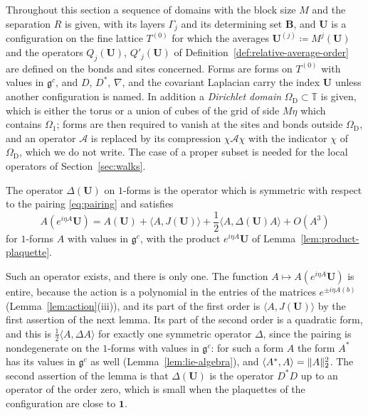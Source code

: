 \documentclass[11pt]{preprint}
\newcommand{\id}{\mathbf 1}
\DeclarePairedDelimiter{\norm}{\lVert}{\rVert}
\numberwithin{equation}{section}
\begin{document}
Throughout this section a sequence of domains with the block size $M$ and the separation $R$ is given, with its layers $\Gamma_j$ and its determining set $\mathbf B$, and $\mathbf U$ is a configuration on the fine lattice $T^{(0)}$ for which the averages $\mathbf U^{(j)} \coloneqq M^j(\mathbf U)$ and the operators $Q_j(\mathbf U)$, $Q'_j(\mathbf U)$ of Definition~\ref{def:relative-average-order} are defined on the bonds and sites concerned. Forms are forms on $T^{(0)}$ with values in $\mathfrak g^c$, and $D$, $D^*$, $\nabla$, and the covariant Laplacian carry the index $\mathbf U$ unless another configuration is named. In addition a \emph{Dirichlet domain} $\Omega_\mathrm D \subset \mathbb T$ is given, which is either the torus or a union of cubes of the grid of side $M\eta$ which contains $\Omega_1$; forms are then required to vanish at the sites and bonds outside $\Omega_\mathrm D$, and an operator $\mathcal A$ is replaced by its compression $\chi\mathcal A\chi$ with the indicator $\chi$ of $\Omega_\mathrm D$, which we do not write. The case of a proper subset is needed for the local operators of Section~\ref{sec:walks}.

\begin{definition}\label{def:hessian}
The operator $\Delta(\mathbf U)$ on $1$-forms is the operator which is symmetric with respect to the pairing \eqref{eq:pairing} and satisfies
\begin{equation}\label{eq:action-expansion}
    A(e^{i\eta A}\mathbf U) = A(\mathbf U) + \langle A, J(\mathbf U)\rangle + \frac{1}{2}\langle A, \Delta(\mathbf U)A\rangle + O(A^3)
\end{equation}
for $1$-forms $A$ with values in $\mathfrak g^c$, with the product $e^{i\eta A}\mathbf U$ of Lemma~\ref{lem:product-plaquette}.
\end{definition}

Such an operator exists, and there is only one. The function $A \mapsto A(e^{i\eta A}\mathbf U)$ is entire, because the action is a polynomial in the entries of the matrices $e^{\pm i\eta A(b)}$ (Lemma~\ref{lem:action}(iii)), and its part of the first order is $\langle A, J(\mathbf U)\rangle$ by the first assertion of the next lemma. Its part of the second order is a quadratic form, and this is $\frac{1}{2}\langle A, \Delta A\rangle$ for exactly one symmetric operator $\Delta$, since the pairing is nondegenerate on the $1$-forms with values in $\mathfrak g^c$: for such a form $A$ the form $A^*$ has its values in $\mathfrak g^c$ as well (Lemma~\ref{lem:lie-algebra}), and $\langle A^*, A\rangle = \norm A_2^2$. The second assertion of the lemma is that $\Delta(\mathbf U)$ is the operator $D^*D$ up to an operator of the order zero, which is small when the plaquettes of the configuration are close to $\id$.
\end{document}
